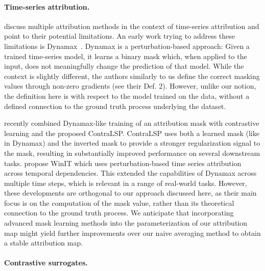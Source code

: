 \paragraph{Time-series attribution.}
    \citealp{ismail2021improvingdeeplearninginterpretability} discuss multiple attribution methods in the context of time-series attribution and point to their potential limitations. An early work trying to address these limitations is Dynamax~\cite{crabbé2021explainingtimeseriespredictions}. Dynamax is a perturbation-based approach: Given a trained time-series model, it learns a binary mask which, when applied to the input, does not meaningfully change the prediction of that model. While the context is slightly different, the authors similarly to us define the correct masking values through non-zero gradients (see their Def. 2). However, unlike our notion, the definition here is with respect to the model trained on the data, without a defined connection to the ground truth process underlying the dataset. 
    
    \citealp{liu2024explaining} recently combined Dynamax-like training of an attribution mask with contrastive learning and the proposed ContraLSP. ContraLSP uses both a learned mask (like in Dynamax) and the inverted mask to provide a stronger regularization signal to the mask, resulting in substantially improved performance on several downstream tasks. \citealp{leung2023temporal} propose WinIT which uses perturbation-based time series attribution across temporal dependencies. This extended the capabilities of Dynamax across multiple time steps, which is relevant in a range of real-world tasks. However, these developments are orthogonal to our approach discussed here, as their main focus is on the computation of the mask value, rather than its theoretical connection to the ground truth process. We anticipate that incorporating advanced mask learning methods into the parameterization of our attribution map might yield further improvements over our naive averaging method to obtain a stable attribution map.

\paragraph{Contrastive surrogates.}

